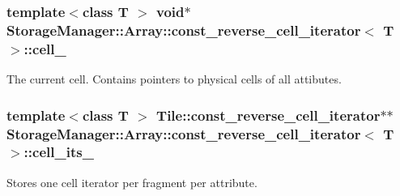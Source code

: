 \subsubsection[{cell\+\_\+}]{\setlength{\rightskip}{0pt plus 5cm}template$<$class T $>$ void$\ast$ {\bf Storage\+Manager\+::\+Array\+::const\+\_\+reverse\+\_\+cell\+\_\+iterator}$<$ T $>$\+::cell\+\_\+\hspace{0.3cm}{\ttfamily [private]}}\label{classStorageManager_1_1Array_1_1const__reverse__cell__iterator_a80af6f1e1e74dd28172ba6f5500289fb}
The current cell. Contains pointers to physical cells of all attibutes. \hypertarget{classStorageManager_1_1Array_1_1const__reverse__cell__iterator_ad4f58978cc17b0bcf4d498915a5cca1b}{}
\subsubsection[{cell\+\_\+its\+\_\+}]{\setlength{\rightskip}{0pt plus 5cm}template$<$class T $>$ {\bf Tile\+::const\+\_\+reverse\+\_\+cell\+\_\+iterator}$\ast$$\ast$ {\bf Storage\+Manager\+::\+Array\+::const\+\_\+reverse\+\_\+cell\+\_\+iterator}$<$ T $>$\+::cell\+\_\+its\+\_\+\hspace{0.3cm}{\ttfamily [private]}}\label{classStorageManager_1_1Array_1_1const__reverse__cell__iterator_ad4f58978cc17b0bcf4d498915a5cca1b}
Stores one cell iterator per fragment per attribute. \hypertarget{classStorageManager_1_1Array_1_1const__reverse__cell__iterator_af073bd6ff65c84ead2a53b23cf6ddf65}{}

